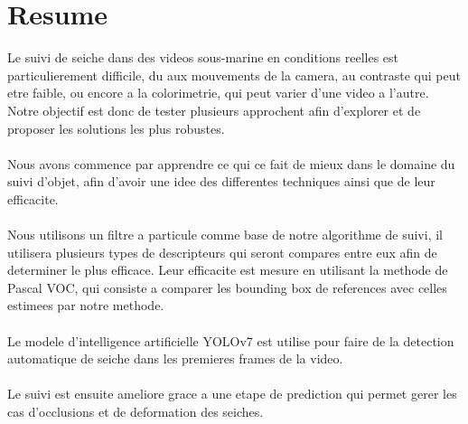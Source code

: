\chapter*{Resume}
Le suivi de seiche dans des videos sous-marine en conditions reelles est particulierement difficile, du aux mouvements de la camera, au contraste qui peut etre faible, ou encore a la colorimetrie, qui peut varier d'une video a l'autre.\\
Notre objectif est donc de tester plusieurs approchent afin d'explorer et de proposer les solutions les plus robustes.\\
\\
Nous avons commence par apprendre ce qui ce fait de mieux dans le domaine du suivi d'objet, afin d'avoir une idee des differentes techniques ainsi que de leur efficacite.\\
\\
Nous utilisons un filtre a particule comme base de notre algorithme de suivi, il utilisera plusieurs types de descripteurs qui seront compares entre eux afin de determiner le plus efficace. Leur efficacite est mesure en utilisant la methode de Pascal VOC, qui consiste a comparer les bounding box de references avec celles estimees par notre methode.\\
\\
Le modele d'intelligence artificielle YOLOv7 est utilise pour faire de la detection automatique de seiche dans les premieres frames de la video.\\
\\
Le suivi est ensuite ameliore grace a une etape de prediction qui permet gerer les cas d'occlusions et de deformation des seiches.

\clearpage